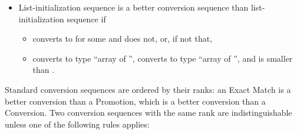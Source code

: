 \begin{itemize}
\item
List-initialization sequence  is a better conversion sequence than
list-initialization sequence  if

\begin{itemize}
\item
{} converts to  for some  and
 does not, or, if not that,

\item
{} converts to type ``array of  '',  converts to
type ``array of  '', and  is smaller than .
\end{itemize}

\end{itemize}

\pnum
Standard conversion sequences are ordered by their ranks: an Exact Match is a
better conversion than a Promotion, which is a better conversion than
a Conversion.
Two conversion sequences with the same rank are indistinguishable unless
one of the following rules applies:

